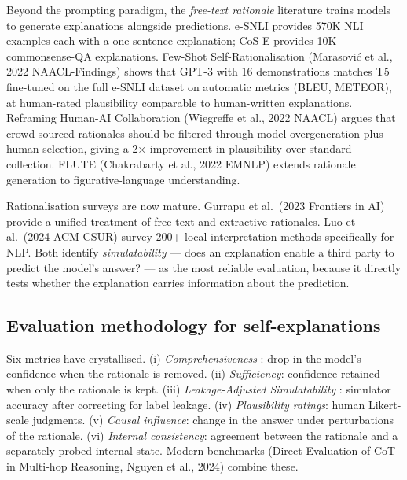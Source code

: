 \documentclass{article}
\begin{document}
Beyond the prompting paradigm, the \emph{free-text rationale} literature trains models to generate explanations alongside predictions. e-SNLI \citep{camburu2018esnlinaturallangua} provides 570K NLI examples each with a one-sentence explanation; CoS-E \citep{rajani2019explainyourselflev} provides 10K commonsense-QA explanations. Few-Shot Self-Rationalisation (Marasović et al., 2022 NAACL-Findings) shows that GPT-3 with 16 demonstrations matches T5 fine-tuned on the full e-SNLI dataset on automatic metrics (BLEU, METEOR), at human-rated plausibility comparable to human-written explanations. Reframing Human-AI Collaboration (Wiegreffe et al., 2022 NAACL) argues that crowd-sourced rationales should be filtered through model-overgeneration plus human selection, giving a 2× improvement in plausibility over standard collection. FLUTE (Chakrabarty et al., 2022 EMNLP) extends rationale generation to figurative-language understanding.

Rationalisation surveys are now mature. Gurrapu et al.~(2023 Frontiers in AI) provide a unified treatment of free-text and extractive rationales. Luo et al.~(2024 ACM CSUR) survey 200+ local-interpretation methods specifically for NLP. Both identify \emph{simulatability} --- does an explanation enable a third party to predict the model's answer? --- as the most reliable evaluation, because it directly tests whether the explanation carries information about the prediction.

\subsection{Evaluation methodology for self-explanations}\label{evaluation-methodology-for-self-explanations}

Six metrics have crystallised. (i) \emph{Comprehensiveness} \citep{deyoung2020eraserabenchmarkto}: drop in the model's confidence when the rationale is removed. (ii) \emph{Sufficiency}: confidence retained when only the rationale is kept. (iii) \emph{Leakage-Adjusted Simulatability} \citep{hase2020leakageadjustedsim}: simulator accuracy after correcting for label leakage. (iv) \emph{Plausibility ratings}: human Likert-scale judgments. (v) \emph{Causal influence}: change in the answer under perturbations of the rationale. (vi) \emph{Internal consistency}: agreement between the rationale and a separately probed internal state. Modern benchmarks (Direct Evaluation of CoT in Multi-hop Reasoning, Nguyen et al., 2024) combine these.
\end{document}
